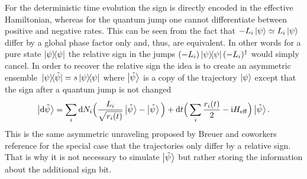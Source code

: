 \documentclass[twocolumn,prl,superscriptaddress]{revtex4-2}
\renewcommand{\i}{\mathrm i}
\begin{document}
For the deterministic time evolution the sign is directly encoded in the effective Hamiltonian, whereas for the quantum jump one cannot differentiate between positive and negative rates. This can be seen from the fact that $-L_i\ket\psi \simeq L_i\ket\psi$ differ by a global phase factor only and, thus, are equivalent. In other words for a pure state $\ketbra{\psi}$ the relative sign in the jumps $(-L_i)\ketbra{\psi}(-L_i)^\dagger$ would simply cancel. In order to recover the relative sign the idea is to create an asymmetric ensemble $\dyad*{\psi}{\tilde\psi}=s \dyad{\psi}{\psi}$ where $\ket{\tilde \psi}$ is a copy of the trajectory $\ket \psi$ except that the sign after a quantum jump is not changed
\begin{align}
	\ket{ \mathrm d\tilde \psi} = \sum_i \mathrm d N_i \Big(\frac{L_i }{\sqrt{ r_i(t)}} \ket{\tilde \psi} - \ket{\tilde \psi} \Big) + \mathrm d t \Big( \sum_i \frac{ r_i(t)}{2} - \i H_\mathrm{eff} \Big) \ket{\tilde \psi}.
	\label{eq:app_ito_formalism_copy}
\end{align}
This is the same asymmetric unraveling proposed by Breuer and coworkers reference \cite{breuerpetruccione1999} for the special case that the trajectories only differ by a relative sign. That is why it is not necessary to simulate $\ket{\tilde \psi}$ but rather storing the information about the additional sign bit. 
\end{document}
